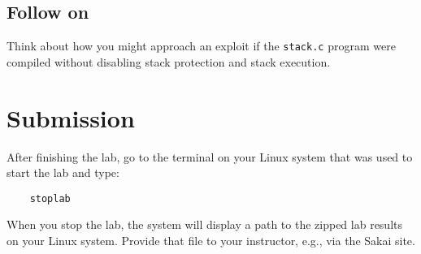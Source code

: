 \subsection{Follow on}
Think about how you might approach an exploit if the {\tt stack.c} program were compiled without disabling stack protection
and stack execution.

\section{Submission}
After finishing the lab, go to the terminal on your Linux system that was used to start the lab and type:
\begin{verbatim}
    stoplab 
\end{verbatim}
When you stop the lab, the system will display a path to the zipped lab results on your Linux system.  Provide that file to 
your instructor, e.g., via the Sakai site.

\copyrightnotice



